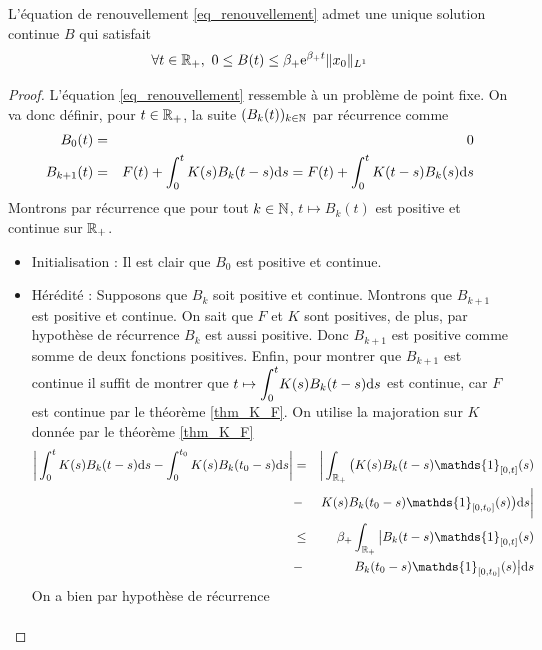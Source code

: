 \begin{theorem}
    L'équation de renouvellement \eqref{eq_renouvellement} admet une unique solution continue $B$ qui satisfait 
    \begin{equation}\label{estim_renouv_B}
        \forall t \in \mathbb{R}_+, \ 0 \leq B(t) \leq \beta_+\mathrm{e}^{\beta_+ t}\|x_0\|_{L^1}
    \end{equation}
\end{theorem}

\begin{proof}
    L'équation \eqref{eq_renouvellement} ressemble à un problème de point fixe. On va donc définir, pour $t \in \mathbb{R}_+$, la suite $(B_k(t))_{k \in \mathbb{N}}$ par récurrence comme 
    \begin{eqnarray}\label{eq_renouvellement_suite}
        B_0(t) &=& 0 \nonumber \\
        B_{k+1}(t) &=& F(t) + \int_0^tK(s)B_{k}(t-s)\mathrm{d} s
        = F(t) + \int_0^tK(t-s)B_{k}(s)\mathrm{d} s 
    \end{eqnarray}
    Montrons par récurrence que pour tout $k \in \mathbb{N}$, $t \mapsto B_k(t)$ est positive et continue sur $\mathbb{R}_+$.
    \begin{itemize}
        \item Initialisation : Il est clair que $B_0$ est positive et continue.
        \item Hérédité : Supposons que $B_k$ soit positive et continue. Montrons que $B_{k+1}$ est positive et continue. On sait que $F$ et $K$ sont positives, de plus, par hypothèse de récurrence $B_k$ est aussi positive. Donc $B_{k+1}$ est positive comme somme de deux fonctions positives. Enfin, pour montrer que $B_{k+1}$ est continue il suffit de montrer que $t \mapsto \displaystyle{\int_0^t} K(s)B_k(t-s)\mathrm{d} s$ est continue, car $F$ est continue par le théorème \ref{thm_K_F}. On utilise la majoration sur $K$ donnée par le théorème \ref{thm_K_F}
        \begin{eqnarray*}
            \bigg|\int_0^t K(s)B_k(t-s)\d s - \int_0^{t_0} K(s)B_k(t_0-s)\d s\bigg| &=& \bigg|\int_{\bbR_+} \big(K(s)B_k(t-s)\mathds{1}_{[0,t]}(s)\\
            &-& K(s)B_k(t_0-s)\mathds{1}_{[0,t_0]}(s)\big)\d s\bigg| \\
            &\leq& \beta_+ \int_{\bbR_+}\big|B_k(t-s)\mathds{1}_{[0,t]}(s)\\
            &-& B_k(t_0-s)\mathds{1}_{[0,t_0]}(s)\big|\d s
        \end{eqnarray*}
        On a bien par hypothèse de récurrence
        \begin{eqnarray*}

\end{eqnarray*}
\end{itemize}
\end{proof}
